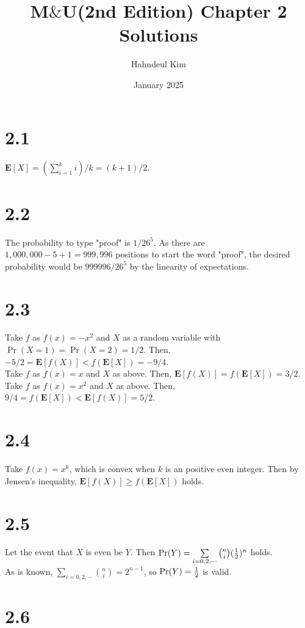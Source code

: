 \documentclass{article}
\title{M$\&$U(2nd Edition) Chapter 2 Solutions}
\author{Hahndeul Kim}
\date{January 2025}
\begin{document}
\maketitle
\newpage
\section*{2.1}
$\textbf{E}[X]=\left(\sum\limits_{i=1}^ki\right)/k=(k+1)/2$.
\section*{2.2}
The probability to type "proof" is $1/26^5$. As there are $1,000,000-5+1=999,996$ positions to start the word "proof", the desired probability would be $999996/26^5$ by the linearity of expectations.
\section*{2.3}
Take $f$ as $f(x)=-x^2$ and $X$ as a random variable with $\Pr(X=1)=\Pr(X=2)=1/2$. Then, $-5/2=\textbf{E}[f(X)]<f(\textbf{E}[X])=-9/4$.\\
Take $f$ as $f(x)=x$ and $X$ as above. Then, $\textbf{E}[f(X)]=f(\textbf{E}[X])=3/2$.\\
Take $f$ as $f(x)=x^2$ and $X$ as above. Then, $9/4=f(\textbf{E}[X])<\textbf{E}[f(X)]=5/2$.
\section*{2.4}
Take $f(x)=x^k$, which is convex when $k$ is an positive even integer.
Then by Jensen's inequality, $\textbf{E}[f(X)] \geq f(\textbf{E}[X])$ holds.
\section*{2.5}
Let the event that $X$ is even be $Y$. Then $\Pr(Y)=\sum\limits_{i=0,2,\cdots}\binom{n}{i}({{1}\over{2}})^n$ holds.\\
As is known, $\sum\limits_{i=0,2,\cdots}\binom{n}{i}=2^{n-1}$, so $\Pr(Y)={{1}\over{2}}$ is valid.
\section*{2.6}
\end{document}
